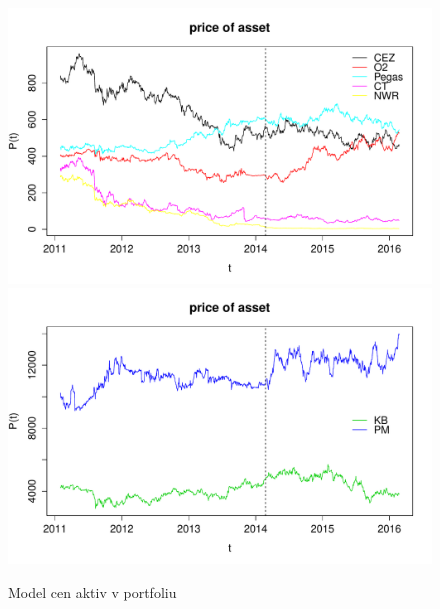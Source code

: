 \documentclass[a4paper,12pt]{report}
\theoremstyle{definition} \newtheorem{definice}[veta]{Definice}
\theoremstyle{remark}
\begin{document}
\begin{figure}[!htbp]
  \centering 
	\includegraphics[width=13.5cm, clip, trim= 0 15 25 50]{IMG/ds_price_of_asset_ostatni.pdf}\\[5mm]
	\includegraphics[width=13.5cm, clip, trim= 0 15 25 50]{IMG/ds_price_of_asset_KBPM_v2.pdf}	
  \caption{Model cen aktiv v portfoliu}  \label{price_of_asset}
\end{figure}
\end{document}
